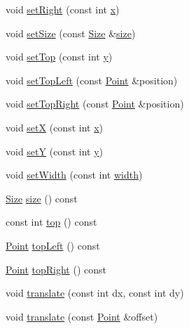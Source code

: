 \begin{DoxyCompactItemize}
void \hyperlink{classprism_1_1_rect_a2e43d5a19fddd80fdbcee1c8892a775d}{set\+Right} (const int \hyperlink{classprism_1_1_rect_a202fa9a56964c9111a968fb9b420f5f4}{x})
\item 
void \hyperlink{classprism_1_1_rect_a53275ba29c1cdb4db5a728f26eae9662}{set\+Size} (const \hyperlink{classprism_1_1_size}{Size} \&\hyperlink{classprism_1_1_rect_adcbe6d279ad57294c88d287057867a2b}{size})
\item 
void \hyperlink{classprism_1_1_rect_afb4e4ead74ed1d0bf300fb37266b47d4}{set\+Top} (const int \hyperlink{classprism_1_1_rect_a6e951744e0bba0fed781b86ab0be680b}{y})
\item 
void \hyperlink{classprism_1_1_rect_ae417c702d2ae34b49bb98d38c4b769a4}{set\+Top\+Left} (const \hyperlink{classprism_1_1_point}{Point} \&position)
\item 
void \hyperlink{classprism_1_1_rect_a160eff655569c91544cb4559663b7397}{set\+Top\+Right} (const \hyperlink{classprism_1_1_point}{Point} \&position)
\item 
void \hyperlink{classprism_1_1_rect_a52362693dd88bececa0ee8083e316792}{setX} (const int \hyperlink{classprism_1_1_rect_a202fa9a56964c9111a968fb9b420f5f4}{x})
\item 
void \hyperlink{classprism_1_1_rect_a4a55e496695d8ccbcadd49305bf22617}{setY} (const int \hyperlink{classprism_1_1_rect_a6e951744e0bba0fed781b86ab0be680b}{y})
\item 
void \hyperlink{classprism_1_1_rect_a8e6c00c46158a9c993e7fb33f3d8befd}{set\+Width} (const int \hyperlink{classprism_1_1_rect_a8dae47a50fdac7a5f7e8aabef68437aa}{width})
\item 
\hyperlink{classprism_1_1_size}{Size} \hyperlink{classprism_1_1_rect_adcbe6d279ad57294c88d287057867a2b}{size} () const 
\item 
const int \hyperlink{classprism_1_1_rect_a1e89336f88213ac0672643d188133bab}{top} () const 
\item 
\hyperlink{classprism_1_1_point}{Point} \hyperlink{classprism_1_1_rect_a2900a6e837124886d2e6aa500fba5bde}{top\+Left} () const 
\item 
\hyperlink{classprism_1_1_point}{Point} \hyperlink{classprism_1_1_rect_a0a5e7ccdaeb397649e1e9331110a7343}{top\+Right} () const 
\item 
void \hyperlink{classprism_1_1_rect_a18f564924e2d800589ddf8af039fa248}{translate} (const int dx, const int dy)
\item 
void \hyperlink{classprism_1_1_rect_ab4fd05471a4321adf84dadefa85668b7}{translate} (const \hyperlink{classprism_1_1_point}{Point} \&offset)

\end{DoxyCompactItemize}

